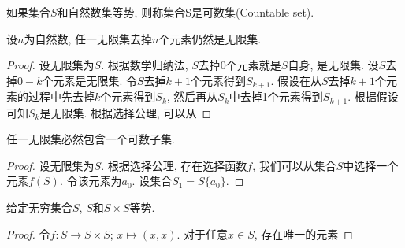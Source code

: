 \begin{definition}[可数集]
	如果集合$S$和自然数集等势, 则称集合S是可数集(Countable set).
\end{definition}

\begin{proposition}
	设$n$为自然数, 任一无限集去掉$n$个元素仍然是无限集.
\end{proposition}

\begin{proof}
	设无限集为$S$. 根据数学归纳法, $S$去掉0个元素就是$S$自身, 是无限集. 设$S$去掉$0-k$个元素是无限集. 令$S$去掉$k+1$个元素得到$S_{k+1}$. 假设在从$S$去掉$k+1$个元素的过程中先去掉$k$个元素得到$S_k$, 然后再从$S_k$中去掉1个元素得到$S_{k+1}$. 根据假设可知$S_k$是无限集. 根据选择公理, 可以从
\end{proof}

\begin{proposition}
	任一无限集必然包含一个可数子集.
\end{proposition}

\begin{proof}
	设无限集为$S$. 根据选择公理, 存在选择函数$f$, 我们可以从集合$S$中选择一个元素$f(S)$. 令该元素为$a_0$. 设集合$S_1=S\{a_0\}$. 
\end{proof}

\begin{proposition}
	给定无穷集合$S$, $S$和$S\times S$等势.
\end{proposition}

\begin{proof}
	令$f\colon S\rightarrow S\times S$; $x\mapsto (x,x)$. 对于任意$x\in S$, 存在唯一的元素
	
\end{proof}
